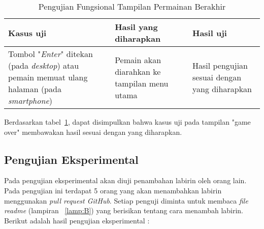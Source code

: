 \begin{enumerate}
	\begin{table}[H]
		\caption{Pengujian Fungsional Tampilan Permainan Berakhir} \label{tab:table4}
		\begin{tabular}{| m{4cm} | m{6cm}  | m{4cm} |}
			\hline
			Kasus uji & Hasil yang diharapkan & Hasil uji \\ \hline
			Tombol "\textit{Enter}" ditekan (pada \textit{desktop}) atau pemain memuat ulang halaman (pada \textit{smartphone})& Pemain akan diarahkan ke tampilan menu utama & Hasil pengujian sesuai dengan yang diharapkan\\ \hline
		\end{tabular}
	\end{table}
	
	Berdasarkan tabel~\ref{tab:table4}, dapat disimpulkan bahwa kasus uji pada tampilan "game over" membawakan hasil sesuai dengan yang diharapkan. 
\end{enumerate}

\subsection{Pengujian Eksperimental}
Pada pengujian eksperimental akan diuji penambahan labirin oleh orang lain. Pada pengujian ini terdapat 5 orang yang akan menambahkan labirin menggunakan \textit{pull request GitHub}. Setiap penguji diminta untuk membaca \textit{file} \textit{readme} (lampiran ~\ref{lamp:B}) yang berisikan tentang cara menambah labirin. Berikut adalah hasil pengujian eksperimental : 

